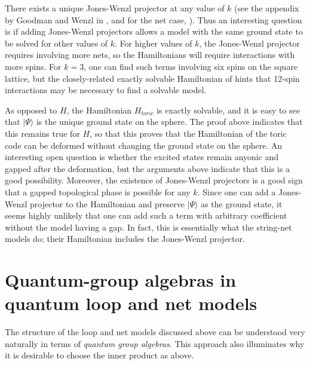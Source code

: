 \documentclass[11pt]{article}
\begin{document}
There exists a unique Jones-Wenzl projector at any value of
$k$ (see the appendix by Goodman and Wenzl in \cite{Freedman01}, and
for the net case, \cite{FKrush}). Thus an interesting question is if
adding Jones-Wenzl projectors allows a model
with the same ground state to be solved for other values of $k$. For
higher values of $k$, the Jones-Wenzl projector requires involving
more nets, so the Hamiltonians will require interactions with more
spins. For $k=3$, one can find such terms involving six spins on
the square lattice, but the closely-related exactly solvable
Hamiltonian of \cite{LevinWen} hints that 12-spin interactions may be
necessary to find a solvable model. 



As opposed to $H$, the Hamiltonian $H_{toric}$ is exactly solvable,
and it is easy to see that $|\Psi\rangle$ is the unique ground state
on the sphere.  The proof above indicates that this remains true for
$H$, so that this proves that the Hamiltonian of the toric code can be
deformed without changing the ground state on the sphere. An
interesting open question is whether the excited states remain anyonic
and gapped after the deformation, but the arguments above indicate
that this is a good possibility. Moreover, the existence of
Jones-Wenzl projectors is a good sign that a gapped
topological phase is possible for any $k$. Since one can add a Jones-Wenzl
projector to the Hamiltonian and preserve $|\Psi\rangle$ as the ground
state, it seems highly unlikely that one can add such a term with
arbitrary coefficient without the model having a gap. In fact, this is
essentially what the string-net models do; their Hamiltonian includes
the Jones-Wenzl projector. 




\section{Quantum-group algebras in quantum loop and net models}
\label{sec:qga}

The structure of the loop and net models discussed above can be
understood very naturally in terms of {\em quantum group algebras}.
This approach also illuminates why it is
desirable to choose the inner product as above.
 
\end{document}
